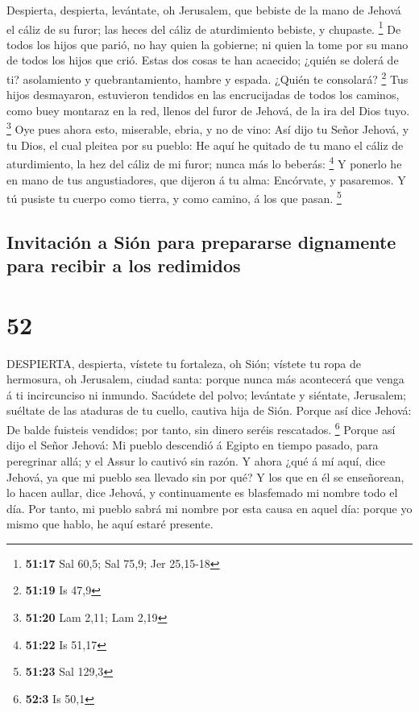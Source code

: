  Despierta, despierta, levántate, oh Jerusalem, que bebiste
de la mano de Jehová el cáliz de su furor; las heces del cáliz de
aturdimiento bebiste, y chupaste. \footnote{\textbf{51:17} Sal 60,5; Sal
  75,9; Jer 25,15-18}  De todos los hijos que parió, no hay
quien la gobierne; ni quien la tome por su mano de todos los hijos que
crió.  Estas dos cosas te han acaecido; ¿quién se dolerá de
ti? asolamiento y quebrantamiento, hambre y espada. ¿Quién te consolará?
\footnote{\textbf{51:19} Is 47,9}  Tus hijos desmayaron,
estuvieron tendidos en las encrucijadas de todos los caminos, como buey
montaraz en la red, llenos del furor de Jehová, de la ira del Dios tuyo.
\footnote{\textbf{51:20} Lam 2,11; Lam 2,19}  Oye pues
ahora esto, miserable, ebria, y no de vino:  Así dijo tu
Señor Jehová, y tu Dios, el cual pleitea por su pueblo: He aquí he
quitado de tu mano el cáliz de aturdimiento, la hez del cáliz de mi
furor; nunca más lo beberás: \footnote{\textbf{51:22} Is 51,17}
 Y ponerlo he en mano de tus angustiadores, que dijeron á
tu alma: Encórvate, y pasaremos. Y tú pusiste tu cuerpo como tierra, y
como camino, á los que pasan. \footnote{\textbf{51:23} Sal 129,3}

\hypertarget{invitaciuxf3n-a-siuxf3n-para-prepararse-dignamente-para-recibir-a-los-redimidos}{%
\subsection{Invitación a Sión para prepararse dignamente para recibir a
los
redimidos}\label{invitaciuxf3n-a-siuxf3n-para-prepararse-dignamente-para-recibir-a-los-redimidos}}

\hypertarget{section-51}{%
\section{52}\label{section-51}}

 DESPIERTA, despierta, vístete tu fortaleza, oh Sión;
vístete tu ropa de hermosura, oh Jerusalem, ciudad santa: porque nunca
más acontecerá que venga á ti incircunciso ni inmundo. 
Sacúdete del polvo; levántate y siéntate, Jerusalem; suéltate de las
ataduras de tu cuello, cautiva hija de Sión.  Porque así
dice Jehová: De balde fuisteis vendidos; por tanto, sin dinero seréis
rescatados. \footnote{\textbf{52:3} Is 50,1}  Porque así
dijo el Señor Jehová: Mi pueblo descendió á Egipto en tiempo pasado,
para peregrinar allá; y el Assur lo cautivó sin razón.  Y
ahora ¿qué á mí aquí, dice Jehová, ya que mi pueblo sea llevado sin por
qué? Y los que en él se enseñorean, lo hacen aullar, dice Jehová, y
continuamente es blasfemado mi nombre todo el día.  Por
tanto, mi pueblo sabrá mi nombre por esta causa en aquel día: porque yo
mismo que hablo, he aquí estaré presente.

